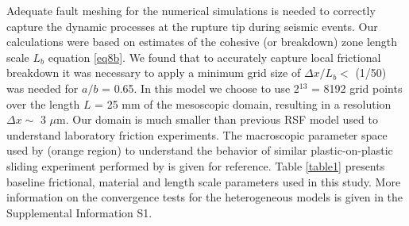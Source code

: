 \documentclass[preprint,1p, 10pt,authoryear]{elsarticle}
\begin{document}
Adequate fault meshing for the numerical simulations is needed to correctly capture the dynamic processes at the rupture tip during seismic events. Our calculations were based on estimates of the cohesive (or breakdown) zone length scale $L_{b}$  equation \eqref{eq8b}. We found that to accurately capture local frictional breakdown it was necessary to apply a minimum grid size of $\Delta x/L_{b} <$ (1/50) was needed for $a/b$ = 0.65.  In this model we choose to use 2$^{13}$ = 8192 grid points over the length $L$ = 25 mm of the mesoscopic domain, resulting in a resolution $\Delta x \sim$  3 $\mu$m. Our domain is much smaller than previous RSF model used to understand laboratory friction experiments. The macroscopic parameter space used by \citet{Kaneko2016} (orange  region) to understand the behavior of similar plastic-on-plastic sliding experiment performed by \citet{Latour2013} is given for reference. Table \ref{table1} presents baseline frictional, material and length scale parameters used in this study. More information on the convergence tests for the heterogeneous models is given in the Supplemental Information S1.
\end{document}
